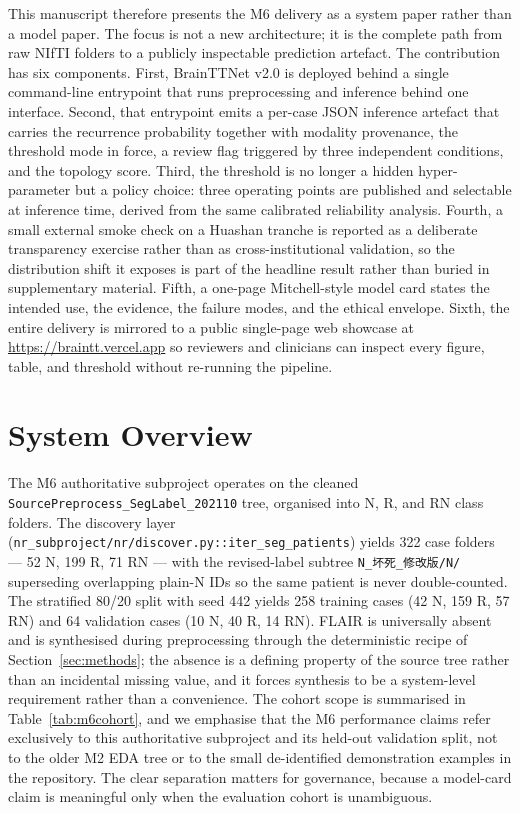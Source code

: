 \documentclass[11pt,a4paper]{article}
\begin{document}
This manuscript therefore presents the M6 delivery as a system paper rather than a model paper. The focus is not a new architecture; it is the complete path from raw NIfTI folders to a publicly inspectable prediction artefact. The contribution has six components. First, BrainTTNet v2.0 is deployed behind a single command-line entrypoint that runs preprocessing and inference behind one interface. Second, that entrypoint emits a per-case JSON inference artefact that carries the recurrence probability together with modality provenance, the threshold mode in force, a review flag triggered by three independent conditions, and the topology score. Third, the threshold is no longer a hidden hyper-parameter but a policy choice: three operating points are published and selectable at inference time, derived from the same calibrated reliability analysis. Fourth, a small external smoke check on a Huashan tranche is reported as a deliberate transparency exercise rather than as cross-institutional validation, so the distribution shift it exposes is part of the headline result rather than buried in supplementary material. Fifth, a one-page Mitchell-style model card states the intended use, the evidence, the failure modes, and the ethical envelope. Sixth, the entire delivery is mirrored to a public single-page web showcase at \url{https://braintt.vercel.app} so reviewers and clinicians can inspect every figure, table, and threshold without re-running the pipeline.

\section{System Overview}

The M6 authoritative subproject operates on the cleaned \texttt{SourcePreprocess\_SegLabel\_202110} tree, organised into N, R, and RN class folders. The discovery layer (\texttt{nr\_subproject/nr/discover.py::iter\_seg\_patients}) yields 322 case folders --- 52 N, 199 R, 71 RN --- with the revised-label subtree \texttt{N\_坏死\_修改版/N/} superseding overlapping plain-N IDs so the same patient is never double-counted. The stratified 80/20 split with seed 442 yields 258 training cases (42 N, 159 R, 57 RN) and 64 validation cases (10 N, 40 R, 14 RN). FLAIR is universally absent and is synthesised during preprocessing through the deterministic recipe of Section~\ref{sec:methods}; the absence is a defining property of the source tree rather than an incidental missing value, and it forces synthesis to be a system-level requirement rather than a convenience. The cohort scope is summarised in Table~\ref{tab:m6cohort}, and we emphasise that the M6 performance claims refer exclusively to this authoritative subproject and its held-out validation split, not to the older M2 EDA tree or to the small de-identified demonstration examples in the repository. The clear separation matters for governance, because a model-card claim is meaningful only when the evaluation cohort is unambiguous.
\end{document}

